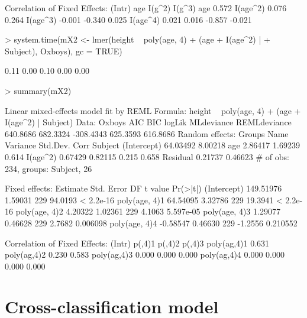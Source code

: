 \documentclass[12pt]{article}
\begin{document}
\begin{Schunk}
\begin{Soutput}
Correlation of Fixed Effects:
         (Intr) age    I(g^2) I(g^3)
age       0.572                     
I(age^2)  0.076  0.264              
I(age^3) -0.001 -0.340  0.025       
I(age^4)  0.021  0.016 -0.857 -0.021
\end{Soutput}
\begin{Sinput}
> system.time(mX2 <- lmer(height ~ poly(age, 4) + (age + I(age^2) | 
+     Subject), Oxboys), gc = TRUE)
\end{Sinput}
\begin{Soutput}
[1] 0.11 0.00 0.10 0.00 0.00
\end{Soutput}
\begin{Sinput}
> summary(mX2)
\end{Sinput}
\begin{Soutput}
Linear mixed-effects model fit by REML
Formula: height ~ poly(age, 4) + (age + I(age^2) | Subject) 
   Data: Oxboys 
      AIC      BIC    logLik MLdeviance REMLdeviance
 640.8686 682.3324 -308.4343   625.3593     616.8686
Random effects:
 Groups   Name        Variance Std.Dev. Corr        
 Subject  (Intercept) 64.03492 8.00218              
          age          2.86417 1.69239  0.614       
          I(age^2)     0.67429 0.82115  0.215 0.658 
 Residual              0.21737 0.46623              
# of obs: 234, groups: Subject, 26

Fixed effects:
               Estimate Std. Error  DF t value  Pr(>|t|)
(Intercept)   149.51976    1.59031 229 94.0193 < 2.2e-16
poly(age, 4)1  64.54095    3.32786 229 19.3941 < 2.2e-16
poly(age, 4)2   4.20322    1.02361 229  4.1063 5.597e-05
poly(age, 4)3   1.29077    0.46628 229  2.7682  0.006098
poly(age, 4)4  -0.58547    0.46630 229 -1.2556  0.210552

Correlation of Fixed Effects:
            (Intr) p(,4)1 p(,4)2 p(,4)3
poly(ag,4)1 0.631                      
poly(ag,4)2 0.230  0.583               
poly(ag,4)3 0.000  0.000  0.000        
poly(ag,4)4 0.000  0.000  0.000  0.000 
\end{Soutput}
\end{Schunk}

\section{Cross-classification model}
\label{sec:CrossClassified}
\end{document}
